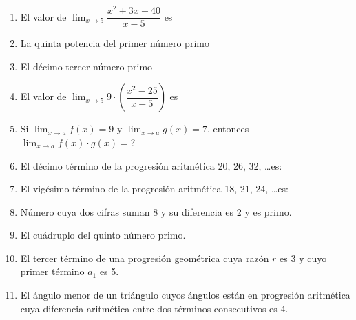 \documentclass[letterpaper,11pt,twoside]{article}
\begin{document}
\begin{multicols}{2}
\begin{enumerate}
\item El valor de $\displaystyle{\lim_{x\rightarrow 5}}\dfrac{x^{2}+3x-40}{x-5}$ es
\item La quinta potencia del primer número primo
\item El décimo tercer número primo
\item El valor de $\displaystyle{\lim_{x\rightarrow 5}9\cdot
\left(\dfrac{x^{2}-25}{x-5}\right)}$ es
\item Si $\displaystyle{\lim_{x\rightarrow a}f(x)}=9$ y $\displaystyle{\lim_{x\rightarrow a}g(x)}=7$, entonces $\displaystyle{\lim_{x\rightarrow a}f(x)\cdot g(x)}=$?
\item El décimo término de la progresión aritmética 20, 26, 32, \ldots es:
\item El vigésimo término de la progresión aritmética 18, 21, 24, \ldots es:
\item Número cuya dos cifras suman 8 y su diferencia es 2 y es primo.
\item El cuádruplo del quinto número primo.
\item El tercer término de una progresión geométrica cuya razón $r$ es 3 y cuyo primer término $a_{1}$ es 5.
\item El ángulo menor de un triángulo cuyos ángulos están en progresión aritmética cuya diferencia aritmética entre dos términos consecutivos es 4.


\end{enumerate}
\end{multicols}
\end{document}
